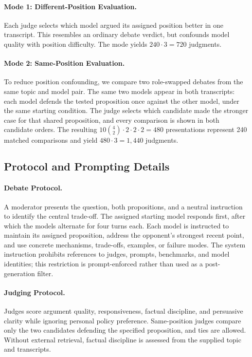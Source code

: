 \documentclass{article}
\begin{document}
\paragraph{Mode 1: Different-Position Evaluation.}
Each judge selects which model argued its assigned position better in one transcript. This resembles an ordinary debate verdict, but confounds model quality with position difficulty. The mode yields $240\cdot3=720$ judgments.


\paragraph{Mode 2: Same-Position Evaluation.}
To reduce position confounding, we compare two role-swapped debates from the same topic and model pair. The same two models appear in both transcripts: each model defends the tested proposition once against the other model, under the same starting condition. The judge selects which candidate made the stronger case for that shared proposition, and every comparison is shown in both candidate orders. The resulting $10\binom{4}{2}\cdot2\cdot2\cdot2=480$ presentations represent 240 matched comparisons and yield $480\cdot3=1{,}440$ judgments.


\subsection{Protocol and Prompting Details}

\paragraph{Debate Protocol.}

A moderator presents the question, both propositions, and a neutral instruction to identify the central trade-off. The assigned starting model responds first, after which the models alternate for four turns each. Each model is instructed to maintain its assigned proposition, address the opponent's strongest recent point, and use concrete mechanisms, trade-offs, examples, or failure modes. The system instruction prohibits references to judges, prompts, benchmarks, and model identities; this restriction is prompt-enforced rather than used as a post-generation filter.

\paragraph{Judging Protocol.}
Judges score argument quality, responsiveness, factual discipline, and persuasive clarity while ignoring personal policy preference. Same-position judges compare only the two candidates defending the specified proposition, and ties are allowed. Without external retrieval, factual discipline is assessed from the supplied topic and transcripts.
\end{document}
